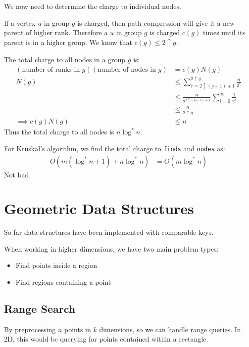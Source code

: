                 We now need to determine the charge to individual nodes.

                If a vertex $u$ in group $g$ is charged, then path compression will give it a new parent of higher rank.
                Therefore a $u$ in group $g$ is charged $c(g)$ times until its parent is in a higher group.
                We know that $c(g) \le 2 \uparrow g$.

                The total charge to all nodes in a group $g$ is:
                \begin{align*}
                    (\text{number of ranks in $g$})(\text{number of nodes in $g$}) &= c(g)N(g) \\
                    N(g) &\le \sum_{r = 2\uparrow(g-1)+1}^{2 \uparrow g} \frac{n}{2^r} \\
                    &\le \frac{n}{2^{2 \uparrow(g-1)+1}} \sum_{i=0}^\infty \frac{1}{2^i} \\
                    &\le \frac{n}{2 \uparrow g} \\
                    \implies c(g)N(g) &\le n
                \end{align*}
                Thus the total charge to all nodes is $n \log^* n$.

                For Kruskal's algorithm, we find the total charge to \verb|finds| and \verb|nodes| as:
                \begin{align*}
                    O(m (\log^*n + 1) + n \log^* n) &= O(m \log^* n)
                \end{align*}
                Not bad.
        \chapter{Geometric Data Structures} %
        \label{cha:geometric_data_structures}
            So far data structures have been implemented with comparable keys.

            When working in higher dimensions, we have two main problem types:
            \begin{itemize}
                \item Find points inside a region
                \item Find regions containing a point
            \end{itemize}
            \section{Range Search} %
            \label{sec:range_search}
                By preprocessing $n$ points in $k$ dimensions, so we can handle range queries.
                In 2D, this would be querying for points contained within a rectangle.

